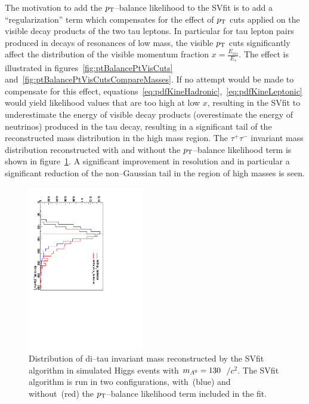 The motivation to add the $p_{\mathrm{T}}$--balance likelihood to the SVfit is to add a
``regularization'' term which compensates for the effect of $p_{\mathrm{T}}$ cuts applied
on the visible decay products of the two tau leptons.  In particular for tau
lepton pairs produced in decays of resonances of low mass, the visible $p_{\mathrm{T}}$
cuts significantly affect the distribution of the visible momentum fraction $x =
\frac{E_{vis}}{E_{\tau}}$.  The effect is illustrated in
figures~\ref{fig:ptBalancePtVisCuts}
and~\ref{fig:ptBalancePtVisCutsCompareMasses}.  If no attempt would be made to
compensate for this effect,
equations~\ref{eq:pdfKineHadronic},~\ref{eq:pdfKineLeptonic} would yield
likelihood values that are too high at low $x$, resulting in the SVfit to
underestimate the energy of visible decay products (overestimate the energy of
neutrinos) produced in the tau decay, resulting in a significant tail of the
reconstructed mass distribution in the high mass region.  The $\tau^{+}
\tau^{-}$ invariant mass distribution reconstructed with and without the
$p_{\mathrm{T}}$--balance likelihood term is shown in
figure~\ref{fig:ptBalanceImprovedMassResolution}.  A significant improvement in
resolution and in particular a significant reduction of the non--Gaussian tail
in the region of high masses is seen.

\begin{figure}[t]
\begin{center}
\includegraphics*[height=72mm,
angle=90]{svfit_chapter/figures/pt_balance_effect.pdf} \caption[Effect of
\pt--balance term on SVfit performance]{\captiontext Distribution of di--tau
invariant mass reconstructed by the SVfit algorithm in simulated Higgs events
with $m_{A^0} = 130$~\GeV$/c^2$.  The SVfit algorithm is run in two
configurations, with~(blue) and without~(red) the $p_{\mathrm{T}}$--balance likelihood term
included in the fit. 
} \label{fig:ptBalanceImprovedMassResolution}
\end{center}
\end{figure} 

